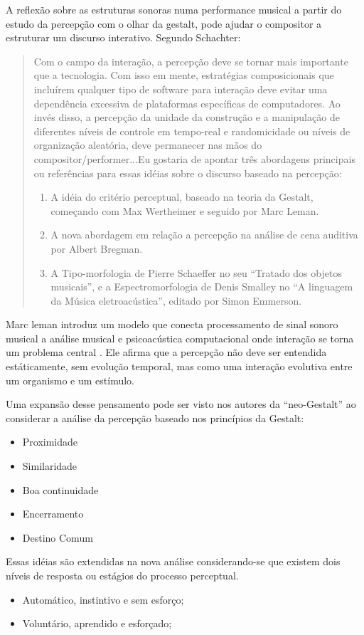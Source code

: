 \documentclass[draft]{ppgmus}
\begin{document}
A reflexão sobre as estruturas sonoras numa performance musical a partir do estudo
da percepção com o olhar da gestalt, pode ajudar o compositor a estruturar um 
discurso interativo. Segundo Schachter:
\begin{quote}
 Com o campo da interação, a percepção deve se tornar mais importante que a tecnologia.
Com isso em mente, estratégias composicionais que incluírem qualquer tipo de software
 para interação deve evitar uma dependência excessiva de plataformas específicas de 
computadores. Ao invés disso, a percepção da unidade da construção e a manipulação de
diferentes níveis de controle em tempo-real e randomicidade ou níveis de organização
aleatória, deve permanecer nas mãos do compositor/performer...Eu gostaria de apontar
três abordagens principais ou referências para essas idéias sobre o discurso baseado
na percepção:
\begin{enumerate}
 \item A idéia do critério perceptual, baseado na teoria da Gestalt, começando com
Max Wertheimer e seguido por Marc Leman.
  \item A nova abordagem em relação a percepção na análise de cena auditiva por Albert
Bregman.
  \item A Tipo-morfologia de Pierre Schaeffer no seu ``Tratado dos objetos musicais'',
e a Espectromorfologia de Denis Smalley no ``A linguagem da Música eletroacústica'', editado
por Simon Emmerson.
\cite{schachter07:discourse}
\end{enumerate}
\end{quote} 


Marc leman introduz um modelo que conecta processamento de 
sinal sonoro musical a análise musical e psicoacústica computacional onde interação
se torna um problema central \cite{leman96:gestalt}. Ele afirma que a percepção não deve ser entendida estáticamente,
sem evolução temporal, mas como uma interação evolutiva entre um organismo e um estímulo.

Uma expansão desse pensamento pode ser visto nos autores da ``neo-Gestalt'' ao considerar
a análise da percepção baseado nos princípios da Gestalt:
\begin{itemize}
 \item Proximidade
  \item Similaridade
  \item Boa continuidade
  \item Encerramento
  \item Destino Comum
\end{itemize}
Essas idéias são extendidas na nova análise considerando-se que existem dois níveis de
resposta ou estágios do processo perceptual.
\begin{itemize}
 \item Automático, instintivo e sem esforço;
  \item Voluntário, aprendido e esforçado;
\end{itemize}
\end{document}
